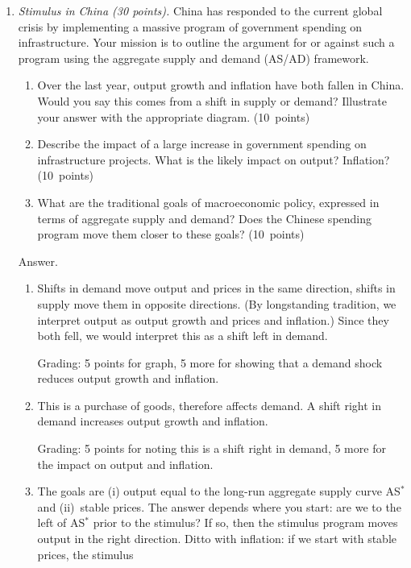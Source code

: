 \documentclass[letterpaper,12pt]{exam}
\begin{document}
\begin{enumerate} 
\item {\it Stimulus in China (30 points).\/}
China has responded to the current global crisis by 
implementing a massive program of government spending 
on infrastructure. 
Your mission is to outline the argument for or against such a program
using the aggregate supply and demand (AS/AD) framework.  
%
\begin{enumerate}

\item Over the last year, output growth and inflation have both fallen in China.  Would you say this comes from a shift in supply or demand?  
    Illustrate your answer with the appropriate diagram.  
    (10~points)

\item Describe the impact of 
a large increase in government spending on infrastructure projects.
What is the likely impact on output?  Inflation?  
(10~points) 

\item What are the traditional goals of macroeconomic policy, 
expressed in terms of aggregate supply and demand?  
Does the Chinese spending program move them closer to these goals?  
(10~points) 

\end{enumerate}

Answer.
\begin{enumerate}
\item Shifts in demand move output and prices in the same direction, 
shifts in supply move them in opposite directions.
(By longstanding tradition, we interpret output as output growth
and prices and inflation.)  
Since they both fell, we would interpret this as a shift left in demand.  

Grading:  5 points for graph, 5 more for showing that 
a demand shock reduces output growth and inflation.  

\item This is a purchase of goods, therefore affects demand. 
A shift right in demand increases output growth and inflation.  

Grading:  5 points for noting this is a shift right in demand, 
5 more for the impact on output and inflation.  

\item The goals are (i) output equal to the long-run aggregate supply curve AS$^*$ and (ii)~stable prices.  
    The answer depends where you start:  are we to the left of AS$^*$ prior to the stimulus?  If so, then the stimulus program moves 
output in the right direction.  
Ditto with inflation:  if we start with stable prices, 
the stimulus 


\end{enumerate}
\end{enumerate}
\end{document}
